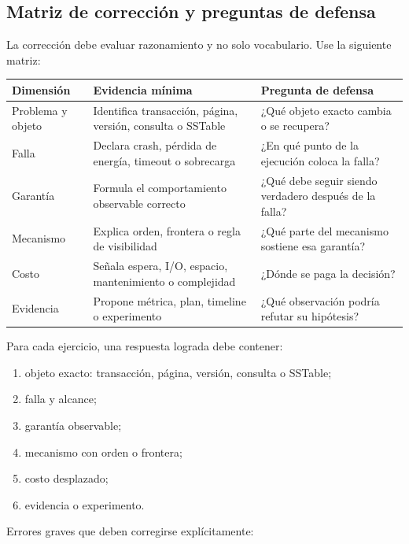 \documentclass[variant=docente,cover=institutional,mode=screen]{ua-engineering-v6-article}
\begin{document}
\subsection{Matriz de corrección y preguntas de defensa}

La corrección debe evaluar razonamiento y no solo vocabulario. Use la siguiente matriz:

\begin{center}
\small
\begin{tabular}{p{}p{}p{}}
\toprule
Dimensión & Evidencia mínima & Pregunta de defensa \\
\midrule
Problema y objeto & Identifica transacción, página, versión, consulta o SSTable & ¿Qué objeto exacto cambia o se recupera? \\
Falla & Declara crash, pérdida de energía, timeout o sobrecarga & ¿En qué punto de la ejecución coloca la falla? \\
Garantía & Formula el comportamiento observable correcto & ¿Qué debe seguir siendo verdadero después de la falla? \\
Mecanismo & Explica orden, frontera o regla de visibilidad & ¿Qué parte del mecanismo sostiene esa garantía? \\
Costo & Señala espera, I/O, espacio, mantenimiento o complejidad & ¿Dónde se paga la decisión? \\
Evidencia & Propone métrica, plan, timeline o experimento & ¿Qué observación podría refutar su hipótesis? \\
\bottomrule
\end{tabular}
\end{center}

Para cada ejercicio, una respuesta lograda debe contener:

\begin{enumerate}
\item objeto exacto: transacción, página, versión, consulta o SSTable;
\item falla y alcance;
\item garantía observable;
\item mecanismo con orden o frontera;
\item costo desplazado;
\item evidencia o experimento.
\end{enumerate}

Errores graves que deben corregirse explícitamente:
\end{document}
